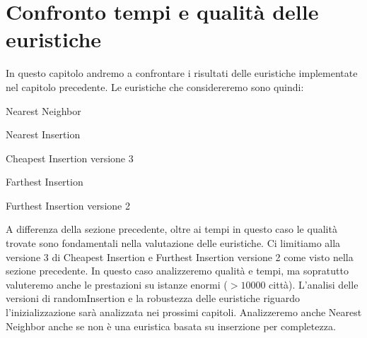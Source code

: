 \documentclass[a4paper,12pt]{report}
\begin{document}
\section{Confronto tempi e qualità delle euristiche}
In questo capitolo andremo a confrontare i risultati delle euristiche implementate nel capitolo precedente. Le euristiche che considereremo sono quindi:
\begin{legal}
  \item Nearest Neighbor
  \item Nearest Insertion
  \item Cheapest Insertion versione 3
  \item Farthest Insertion
  \item Furthest Insertion versione 2
\end{legal}
A differenza della sezione precedente, oltre ai tempi in questo caso le qualità trovate sono fondamentali nella valutazione delle euristiche. Ci limitiamo alla versione 3 di Cheapest Insertion e Furthest Insertion versione 2 come visto nella sezione precedente. In questo caso analizzeremo qualità e tempi, ma sopratutto valuteremo anche le prestazioni su istanze enormi ($> 10000$ città). L'analisi delle versioni di randomInsertion e la robustezza delle euristiche riguardo l'inizializzazione sarà analizzata nei prossimi capitoli. Analizzeremo anche Nearest Neighbor anche se non è una euristica basata su inserzione per completezza.
\end{document}
